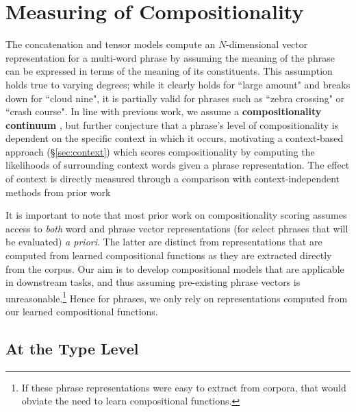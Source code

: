 \documentclass[11pt,letterpaper]{article}
\begin{document}
\section{Measuring of Compositionality}
\label{sec:scoring}

The concatenation and tensor models compute an $N$-dimensional vector representation for a multi-word phrase by assuming the meaning of the phrase can be expressed in terms of the meaning of its constituents. 
This assumption holds true to varying degrees; while it clearly holds for ``large amount" and breaks down for ``cloud nine", it is partially valid for phrases such as ``zebra crossing" or ``crash course". 
In line with previous work, we assume a {\bf compositionality continuum} \cite{McCarthy2003}, but further conjecture that a phrase's level of compositionality is dependent on the specific context in which it occurs,  motivating a context-based approach (\S\ref{sec:context}) which scores compositionality by computing the likelihoods of surrounding context words given a phrase representation. 
The effect of context is directly measured through a comparison with context-independent methods from prior work \cite{Bannard2003,Reddy2011}

It is important to note that most prior work on compositionality scoring assumes access to \emph{both} word and phrase vector representations (for select phrases that will be evaluated) \emph{a priori}.  
The latter are distinct from representations that are computed from learned compositional functions as they are extracted directly from the corpus. 
Our aim is to develop compositional models that are applicable in downstream tasks, and thus assuming pre-existing phrase vectors is unreasonable.\footnote{If these phrase representations were easy to extract from corpora, that would obviate the need to learn compositional functions.}
Hence for phrases, we only rely on representations computed from our learned compositional functions. 

\subsection{At the Type Level}
\label{sec:independent}
\end{document}
